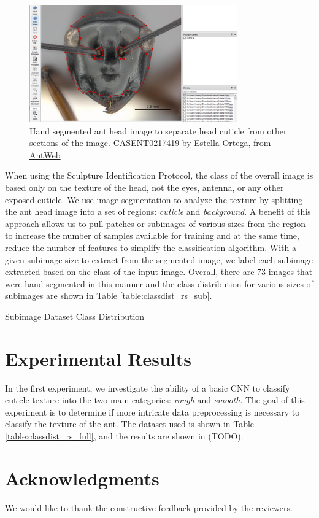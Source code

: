 \documentclass{aci}
\begin{document}
\begin{figure}[h]
  \centering
  \includegraphics[width=0.8\textwidth]{assets/images/segmented_1.png}
  \caption{Hand segmented ant head image to separate head cuticle from other
    sections of the image.
    \href{https://www.antweb.org/bigPicture.do?name=casent0217419&shot=h&number=1}{CASENT0217419}
    by \href{https://www.antweb.org/artist.do?id=92}{Estella Ortega}, from
    \href{https://www.antweb.org}{AntWeb}}
  \label{fig:segmented_1}
\end{figure}

When using the Sculpture Identification Protocol, the class of the overall image
is based only on the texture of the head, not the eyes, antenna, or any other
exposed cuticle. We use image segmentation to analyze the texture by splitting
the ant head image into a set of regions: \textit{cuticle} and
\textit{background}. A benefit of this approach allows us to pull patches or
subimages of various sizes from the region to increase the number of samples
available for training and at the same time, reduce the number of features to
simplify the classification algorithm. With a given subimage size to extract
from the segmented image, we label each subimage extracted based on the class of
the input image. Overall, there are 73 images that were hand segmented in this
manner and the class distribution for various sizes of subimages are shown in
Table \ref{table:classdist_rs_sub}.

\begin{table}[h]
  \centering
  \caption{Subimage Dataset Class Distribution}
  \label{table:classdist_rs_sub}
  
\end{table}

\section{Experimental Results}

In the first experiment, we investigate the ability of a basic CNN to classify
cuticle texture into the two main categories: \textit{rough} and
\textit{smooth}. The goal of this experiment is to determine if more intricate
data preprocessing is necessary to classify the texture of the ant. The dataset
used is shown in Table \ref{table:classdist_rs_full}, and the results are shown
in (TODO).

\section*{Acknowledgments}
We would like to thank the constructive feedback provided by the reviewers.



\end{document}
